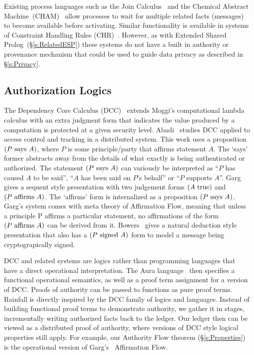 Existing process languages such as the Join Calculus~\cite{Cedric1996:Reflexive} and the Chemical Abstract Machine~(CHAM)~\cite{Berry1992:Chemical} allow processes to wait for multiple related facts (messages) to become available before activating. Similar functionality is available in systems of Constraint Handling Rules (CHR)~\cite{Fruthwirth1998:CHRs}. However, as with Extended Shared Prolog~(\S\ref{s:RelatedESP}) these systems do not have a built in authority or provenance mechanism that could be used to guide data privacy as described in \S\ref{s:Privacy}.


\subsection{Authorization Logics}
The Dependency Core Calculus (DCC)~\cite{Abadi1999:DCC} extends Moggi's computational lambda calculus with an extra judgment form that indicates the value produced by a computation is protected at a given security level. Abadi~\cite{Abadi2007:AccessControl} studies DCC applied to access control and tracking in a distributed system. This work uses a proposition $(P~\textrm{says}~A)$, where $P$ is some principle/party that affirms statement $A$. The `says' former abstracts away from the details of what exactly is being authenticated or authorized. The statement $(P~\textrm{says}~A)$ can variously be interpreted as ``$P$ has caused $A$ to be said'', ``$A$ has been said on $P$'s behalf'' or ``$P$ supports $A$''. Garg~\cite{Garg2006:Constructive} gives a sequent style presentation with two judgement forms $(A~\textrm{true})$ and $(P~\textrm{affirms}~A)$. The `affirms' form is internalized as a proposition $(P~\textrm{says}~A)$. Garg's system comes with meta theory of Affirmation Flow, meaning that unless a principle P affirms a particular statement, no affirmations of the form $(P~\textrm{affirms}~A)$ can be derived from it. Bowers~\cite{Bowers2007:Consumable} gives a natural deduction style presentation that also has a $(P~\textrm{signed}~A)$ form to model a message being cryptograpically signed.

DCC and related systems are logics rather than programming languages that have a direct operational interpretation. The Aura language~\cite{Jia2008:Aura} then specifies a functional operational semantics, as well as a proof term assignment for a version of DCC. Proofs of authority can be passed to functions as pure proof terms. Rainfall is directly inspired by the DCC family of logics and languages. Instead of building functional proof terms to demonstrate authority, we gather it in stages, incrementally writing authorized facts back to the ledger. Our ledger then can be viewed as a distributed proof of authority, where versions of DCC style logical properties still apply. For example, our Authority Flow theorem (\S\ref{s:Properties}) is the operational version of Garg's~\cite{Garg2006:Constructive} Affirmation Flow.
